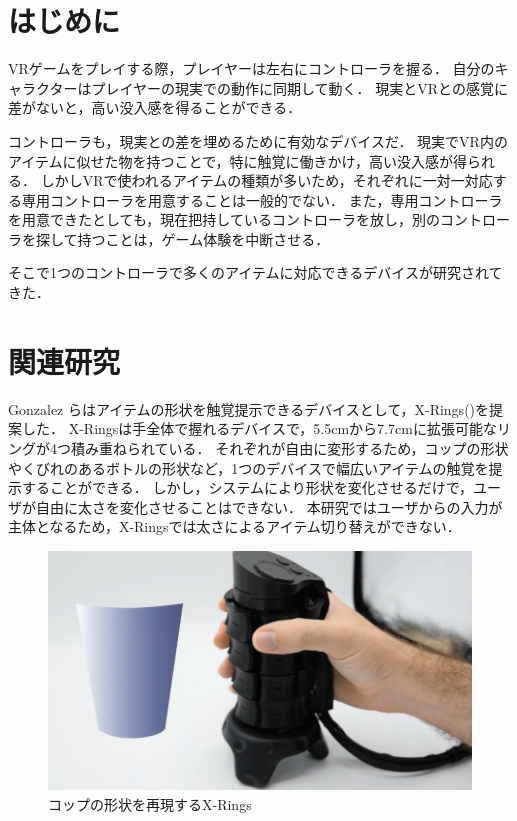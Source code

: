 \documentclass[uplatex]{jsarticle}
\begin{document}
\vspace{3mm}

\setcounter{page}{17}

\section{はじめに}

VRゲームをプレイする際，プレイヤーは左右にコントローラを握る．
自分のキャラクターはプレイヤーの現実での動作に同期して動く．
現実とVRとの感覚に差がないと，高い没入感を得ることができる．

コントローラも，現実との差を埋めるために有効なデバイスだ．
現実でVR内のアイテムに似せた物を持つことで，特に触覚に働きかけ，高い没入感が得られる．
しかしVRで使われるアイテムの種類が多いため，それぞれに一対一対応する専用コントローラを用意することは一般的でない．
また，専用コントローラを用意できたとしても，現在把持しているコントローラを放し，別のコントローラを探して持つことは，ゲーム体験を中断させる．

そこで1つのコントローラで多くのアイテムに対応できるデバイスが研究されてきた．


\section{関連研究}

Gonzalez らはアイテムの形状を触覚提示できるデバイスとして，X-Rings()を提案した\cite{gonzalez2021x-rings}．
X-Ringsは手全体で握れるデバイスで，5.5cmから7.7cmに拡張可能なリングが4つ積み重ねられている．
それぞれが自由に変形するため，コップの形状やくびれのあるボトルの形状など，1つのデバイスで幅広いアイテムの触覚を提示することができる．
しかし，システムにより形状を変化させるだけで，ユーザが自由に太さを変化させることはできない．
本研究ではユーザからの入力が主体となるため，X-Ringsでは太さによるアイテム切り替えができない．

\begin{figure}[htbp]
    \centering
    \includegraphics[width=0.9\linewidth]{fig/X-Rings.png}
    \caption{コップの形状を再現するX-Rings}
    \label{fig:X-Rings}
\end{figure}
\end{document}

